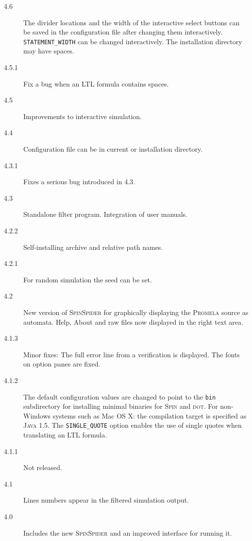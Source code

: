 \documentclass[11pt]{article}
\newcommand{\spn}{\textsc{Spin}}
\newcommand{\prm}{\textsc{Promela}}
\newcommand{\spd}{\textsc{SpinSpider}}
\newcommand{\p}[1]{\texttt{#1}}
\begin{document}
\begin{description}
\item[4.6] The divider locations and the width of the interactive select
buttons can be saved in the configuration file after changing them
interactively. \p{STATEMENT\_WIDTH} can be changed interactively.
The installation directory may have spaces.
\item[4.5.1] Fix a bug when an LTL formula contains spaces.
\item[4.5] Improvements to interactive simulation.
\item[4.4] Configuration file can be in current or installation
directory.
\item[4.3.1] Fixes a serious bug introduced in 4.3.
\item[4.3] Standalone filter program. Integration of user manuals.
\item[4.2.2] Self-installing archive and relative path names.
\item[4.2.1] For random simulation the seed can be set.
\item[4.2] New version of \spd{} for graphically displaying the \prm{} source as automata.
Help, About and raw files now displayed in the right text area.
\item[4.1.3] Minor fixes: The full error line from a verification is displayed.
The fonts on option panes are fixed.
\item[4.1.2] The default configuration values are changed to point to the
\p{bin} subdirectory for installing minimal binaries for \spn{}
and \textsc{dot}.
For non-Windows systems such as Mac OS X: the compilation target is specified as
\textsc{Java} 1.5. The \p{SINGLE\_QUOTE} option enables the use of single quotes
when translating an LTL formula.
\item[4.1.1] Not released.
\item[4.1] Lines numbers appear in the filtered simulation output.
\item[4.0] Includes the new \spd{} and an improved interface for running it.
\end{description}
\end{document}
